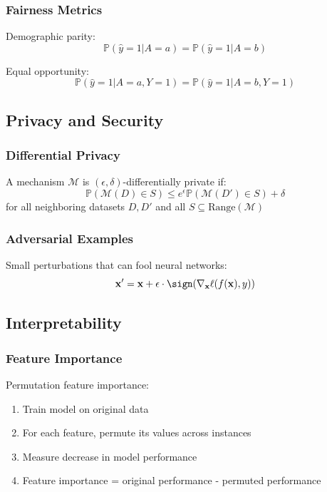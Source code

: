 \documentclass{article}
\begin{document}
\subsubsection{Fairness Metrics}

Demographic parity:
\[
\mathbb{P}(\hat{y} = 1 | A = a) = \mathbb{P}(\hat{y} = 1 | A = b)
\]

Equal opportunity:
\[
\mathbb{P}(\hat{y} = 1 | A = a, Y = 1) = \mathbb{P}(\hat{y} = 1 | A = b, Y = 1)
\]

\subsection{Privacy and Security}

\subsubsection{Differential Privacy}

A mechanism $\mathcal{M}$ is $(\epsilon, \delta)$-differentially private if:
\[
\mathbb{P}(\mathcal{M}(D) \in S) \leq e^\epsilon \mathbb{P}(\mathcal{M}(D') \in S) + \delta
\]
for all neighboring datasets $D, D'$ and all $S \subseteq \text{Range}(\mathcal{M})$

\subsubsection{Adversarial Examples}

Small perturbations that can fool neural networks:
\[
\mathbf{x}' = \mathbf{x} + \epsilon \cdot \sign(\nabla_\mathbf{x} \ell(f(\mathbf{x}), y))
\]

\subsection{Interpretability}

\subsubsection{Feature Importance}

Permutation feature importance:
\begin{enumerate}
\item Train model on original data
\item For each feature, permute its values across instances
\item Measure decrease in model performance
\item Feature importance = original performance - permuted performance
\end{enumerate}
\end{document}
